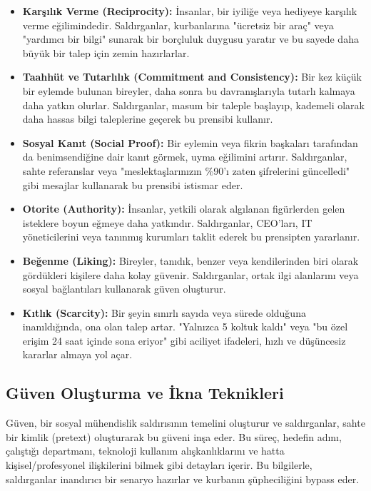 \begin{itemize}
    \item \textbf{Karşılık Verme (Reciprocity):} İnsanlar, bir iyiliğe veya hediyeye karşılık verme eğilimindedir. Saldırganlar, kurbanlarına "ücretsiz bir araç" veya "yardımcı bir bilgi" sunarak bir borçluluk duygusu yaratır ve bu sayede daha büyük bir talep için zemin hazırlarlar.
    \item \textbf{Taahhüt ve Tutarlılık (Commitment and Consistency):} Bir kez küçük bir eylemde bulunan bireyler, daha sonra bu davranışlarıyla tutarlı kalmaya daha yatkın olurlar. Saldırganlar, masum bir taleple başlayıp, kademeli olarak daha hassas bilgi taleplerine geçerek bu prensibi kullanır.
    \item \textbf{Sosyal Kanıt (Social Proof):} Bir eylemin veya fikrin başkaları tarafından da benimsendiğine dair kanıt görmek, uyma eğilimini artırır. Saldırganlar, sahte referanslar veya "meslektaşlarınızın \%90'ı zaten şifrelerini güncelledi" gibi mesajlar kullanarak bu prensibi istismar eder.
    \item \textbf{Otorite (Authority):} İnsanlar, yetkili olarak algılanan figürlerden gelen isteklere boyun eğmeye daha yatkındır. Saldırganlar, CEO'ları, IT yöneticilerini veya tanınmış kurumları taklit ederek bu prensipten yararlanır.
    \item \textbf{Beğenme (Liking):} Bireyler, tanıdık, benzer veya kendilerinden biri olarak gördükleri kişilere daha kolay güvenir. Saldırganlar, ortak ilgi alanlarını veya sosyal bağlantıları kullanarak güven oluşturur.
    \item \textbf{Kıtlık (Scarcity):} Bir şeyin sınırlı sayıda veya sürede olduğuna inanıldığında, ona olan talep artar. "Yalnızca 5 koltuk kaldı" veya "bu özel erişim 24 saat içinde sona eriyor" gibi aciliyet ifadeleri, hızlı ve düşüncesiz kararlar almaya yol açar.
\end{itemize}

\subsection{Güven Oluşturma ve İkna Teknikleri}

Güven, bir sosyal mühendislik saldırısının temelini oluşturur ve saldırganlar, sahte bir kimlik (pretext) oluşturarak bu güveni inşa eder. Bu süreç, hedefin adını, çalıştığı departmanı, teknoloji kullanım alışkanlıklarını ve hatta kişisel/profesyonel ilişkilerini bilmek gibi detayları içerir. Bu bilgilerle, saldırganlar inandırıcı bir senaryo hazırlar ve kurbanın şüpheciliğini bypass eder.

